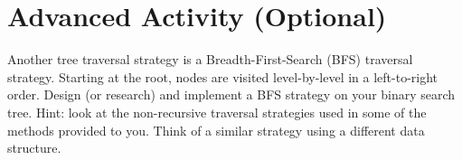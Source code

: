 \documentclass[12pt]{scrartcl}
\begin{document}
\section*{Advanced Activity (Optional)}

Another tree traversal strategy is a Breadth-First-Search (BFS) traversal 
strategy.  Starting at the root, nodes are visited level-by-level 
in a left-to-right order.  Design (or research) and implement a 
BFS strategy on your binary search tree.  Hint: look at the 
non-recursive traversal strategies used in some of the methods 
provided to you.  Think of a similar strategy using a different data 
structure.
\end{document}

